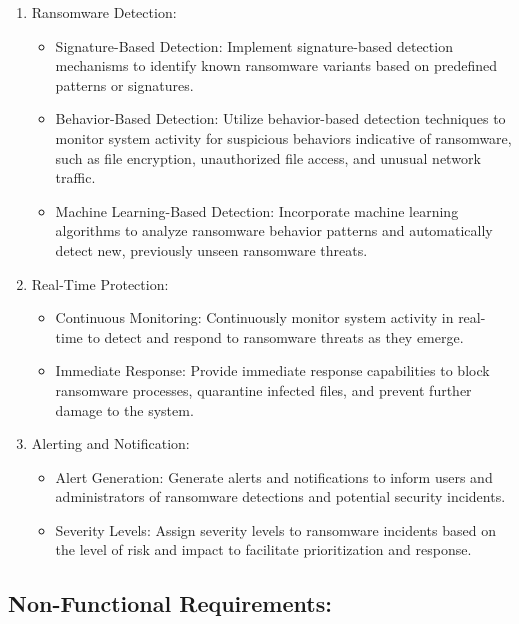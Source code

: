 \documentclass[12pt,twocolumn]{article}
\begin{document}
\begin{enumerate}[label=\arabic*.]
    \item Ransomware Detection:
        \begin{itemize}
             \item Signature-Based Detection: Implement signature-based detection mechanisms to identify known ransomware variants based on predefined patterns or signatures.
            \item Behavior-Based Detection: Utilize behavior-based detection techniques to monitor system activity for suspicious behaviors indicative of ransomware, such as file encryption, unauthorized file access, and unusual network traffic.
            \item Machine Learning-Based Detection: Incorporate machine learning algorithms to analyze ransomware behavior patterns and automatically detect new, previously unseen ransomware threats.
        \end{itemize}

    \item Real-Time Protection:  
        \begin{itemize}
            \item Continuous Monitoring: Continuously monitor system activity in real-time to detect and respond to ransomware threats as they emerge.
            \item Immediate Response: Provide immediate response capabilities to block ransomware processes, quarantine infected files, and prevent further damage to the system.
        \end{itemize}

    \item Alerting and Notification:
        \begin{itemize}
            \item Alert Generation: Generate alerts and notifications to inform users and administrators of ransomware detections and potential security incidents.
            \item Severity Levels: Assign severity levels to ransomware incidents based on the level of risk and impact to facilitate prioritization and response.
        \end{itemize}
           
\end{enumerate}

\subsection{Non-Functional Requirements:}
\end{document}
